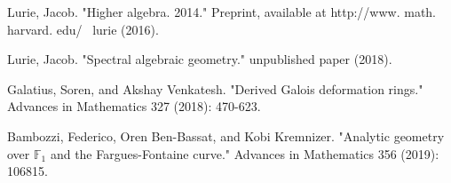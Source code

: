 \documentclass[12pt]{amsart}
\theoremstyle{definition}
\numberwithin{equation}{section}
\begin{document}
\begin{thebibliography}{10}
 Lurie, Jacob. "Higher algebra. 2014." Preprint, available at http://www. math. harvard. edu/~ lurie (2016).

 Lurie, Jacob. "Spectral algebraic geometry." unpublished paper (2018).



 Galatius, Soren, and Akshay Venkatesh. "Derived Galois deformation rings." Advances in Mathematics 327 (2018): 470-623.

 Bambozzi, Federico, Oren Ben-Bassat, and Kobi Kremnizer. "Analytic geometry over $\mathbb{F}_1$ and the Fargues-Fontaine curve." Advances in Mathematics 356 (2019): 106815.

\end{thebibliography}



%
\end{document}
